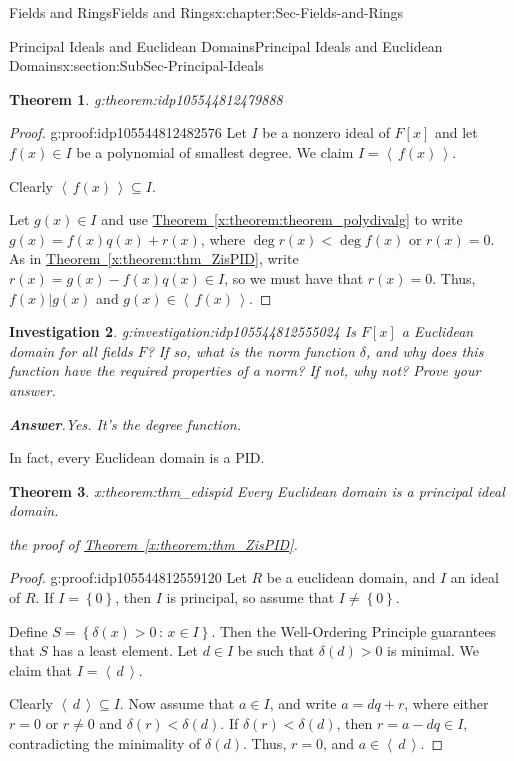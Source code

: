 \documentclass[oneside,10pt,]{book}
\newcommand{\blocktitlefont}{\relax}
\newcommand{\xreffont}{\relax}
\numberwithin{equation}{section}
\newcommand{\ideal}[1]{\left\langle\, #1 \,\right\rangle}
\newcommand{\set}[1]{\left\{ {#1} \right\}}
\newcommand{\setof}[2]{{\left\{#1\,\colon\,#2\right\}}}
\newtheorem{theorem}{Theorem}[section]
\newtheorem{investigation}[theorem]{Investigation}
\newcommand{\lt}{<}
\begin{document}
\begin{chapterptx}{Fields and Rings}{}{Fields and Rings}{}{}{x:chapter:Sec-Fields-and-Rings}
\begin{sectionptx}{Principal Ideals and Euclidean Domains}{}{Principal Ideals and Euclidean Domains}{}{}{x:section:SubSec-Principal-Ideals}
\begin{theorem}{}{}{g:theorem:idp105544812479888}
\end{theorem}
\begin{proof}{}{g:proof:idp105544812482576}
Let \(I\) be a nonzero ideal of \(F[x]\) and let \(f(x)\in I\) be a polynomial of smallest degree. We claim \(I = \ideal{f(x)}\).%
\par
Clearly \(\ideal{f(x)}\subseteq I\).%
\par
Let \(g(x)\in I\) and use \hyperref[x:theorem:theorem_polydivalg]{Theorem~{\xreffont\ref{x:theorem:theorem_polydivalg}}} to write \(g(x) = f(x) q(x) + r(x)\), where \(\deg r(x) \lt \deg f(x)\) or \(r(x) = 0\). As in \hyperref[x:theorem:thm_ZisPID]{Theorem~{\xreffont\ref{x:theorem:thm_ZisPID}}}, write \(r(x) = g(x) - f(x) q(x) \in I\), so we must have that \(r(x) = 0\). Thus, \(f(x) | g(x)\) and \(g(x)\in \ideal{f(x)}\).%
\end{proof}
\begin{investigation}{}{g:investigation:idp105544812555024}%
Is \(F[x]\) a Euclidean domain for all fields \(F\)? If so, what is the norm function \(\delta\), and why does this function have the required properties of a norm? If not, why not? Prove your answer.%
\par\smallskip%
\noindent\textbf{\blocktitlefont Answer}.\hypertarget{g:answer:idp105544812556944}{}\quad{}Yes. It's the degree function.%
\end{investigation}%
In fact, every Euclidean domain is a PID.%
\begin{theorem}{}{}{x:theorem:thm_edispid}%
Every Euclidean domain is a principal ideal domain.%
\par\smallskip%
\noindentMimic the proof of \hyperref[x:theorem:thm_ZisPID]{Theorem~{\xreffont\ref{x:theorem:thm_ZisPID}}}.%
\end{theorem}
\begin{proof}{}{g:proof:idp105544812559120}
Let \(R\) be a euclidean domain, and \(I\) an ideal of \(R\). If \(I = \set{0}\), then \(I\) is principal, so assume that \(I\ne \set{0}\).%
\par
Define \(S = \setof{\delta(x)>0}{x\in I}\). Then the Well-Ordering Principle guarantees that \(S\) has a least element. Let \(d\in I\) be such that \(\delta(d) > 0\) is minimal. We claim that \(I = \ideal{d}\).%
\par
Clearly \(\ideal{d}\subseteq I\). Now assume that \(a\in I\), and write \(a = dq + r\), where either \(r = 0\) or \(r\ne 0\) and \(\delta(r) \lt \delta(d)\). If \(\delta(r) \lt \delta(d)\), then \(r = a - dq \in I\), contradicting the minimality of \(\delta(d)\). Thus, \(r = 0\), and \(a\in \ideal{d}\).%

\end{proof}
\end{sectionptx}
\end{chapterptx}
\end{document}
